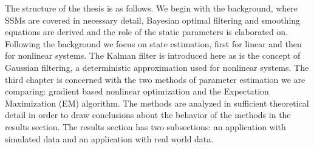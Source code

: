 
The structure of the thesis is as follows. We begin with the background, where
SSMs are covered in necessary detail, Bayesian optimal filtering
and smoothing equations are derived and the role of the static parameters is elaborated
on. Following the background we focus on state estimation, first for linear
and then for nonlinear systems. The Kalman filter is introduced here as is the
concept of Gaussian filtering, a deterministic approximation used for nonlinear systems.
The third chapter is concerned with the two methods
of parameter estimation we are comparing: gradient based nonlinear optimization
and the Expectation Maximization (EM) algorithm. The methods are analyzed in sufficient
theoretical detail in order to draw conclusions about the behavior of the methods
in the results section. The results section has two subsections: 
an application with simulated data and an application with real world data.



